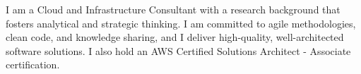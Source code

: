 \documentclass[9pt]{developercv} %
\begin{document}
	\begin{minipage}[t]{0.4\textwidth}
	    \vspace{-\baselineskip} %

	I am a Cloud and Infrastructure Consultant with a research background that fosters analytical and strategic thinking. I am committed to agile methodologies, clean code, and knowledge sharing, and I deliver high-quality, well-architected software solutions. I also hold an AWS Certified Solutions Architect - Associate certification.
	\end{minipage}
	\hfill
	\begin{minipage}[t]{0.5\textwidth}
		\vspace{-\baselineskip} %

		\begin{barchart}{5.5}
		\end{barchart}
	\end{minipage}
	

	
\end{document}
